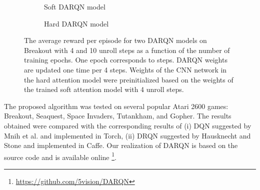 \documentclass{article} \usepackage{nips15submit_e,times}
\begin{document}
\begin{figure}
     \begin{subfigure}[b]{0.50\textwidth}
          \centering
          \caption{Soft DARQN model}
          \label{fig:soft}
     \end{subfigure}
     \begin{subfigure}[b]{0.50\textwidth}
          \centering
          \caption{Hard DARQN model}
          \label{fig:hard}
     \end{subfigure}
	\caption{The average reward per episode for two DARQN models on Breakout with 4 and 10 unroll steps as a function of the number of training epochs. One epoch corresponds to  steps. DARQN weights are updated one time per 4 steps. Weights of the CNN network in the hard attention model were preinitialized based on the weights of the trained soft attention model with 4 unroll steps.}
	\label{fig:unroll}
\end{figure}

The proposed algorithm was tested on several popular Atari 2600 games: Breakout, Seaquest, Space Invaders, Tutankham, and Gopher. The results obtained were compared with the corresponding results of (i) DQN suggested by Mnih et al. \cite{mnih2015human} and implemented in Torch, (ii) DRQN suggested by Hausknecht and Stone \cite{hausknecht2015drqn} and implemented in Caffe. Our realization of DARQN is based on the source code \cite{mnih2015human} and is available online \footnote{\url{https://github.com/5vision/DARQN}}.
\end{document}
